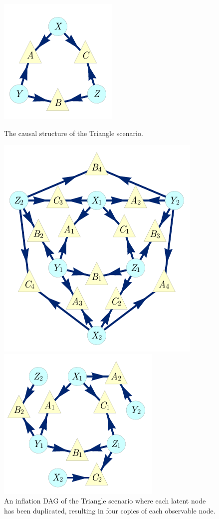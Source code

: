 \begin{figure}[h]
\centering
\begin{minipage}[b]{0.23\linewidth}
\centering
\includegraphics[scale=1]{TriDagRaw.pdf}
\caption{The causal structure of the Triangle scenario.}\label{fig:TriMainDAG}
\end{minipage}
\hfill
\begin{minipage}[t]{0.38\linewidth}
\centering
\includegraphics[scale=1]{TriDagFull222.pdf}
\caption{An inflation DAG of the Triangle scenario where each latent node has been duplicated, resulting in four copies of each observable node.}\label{fig:TriFullDouble}
\end{minipage}
\hfill
\begin{minipage}[b]{0.35\linewidth}
\centering
\includegraphics[scale=1]{TriDagSub222.pdf}

\end{minipage}
\end{figure}
